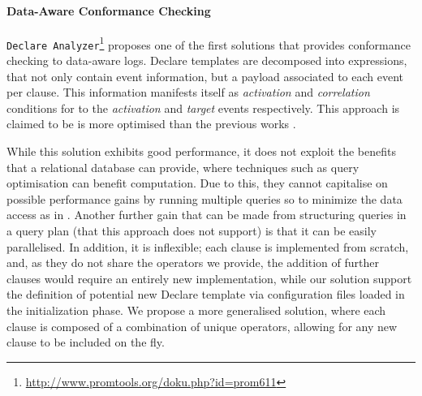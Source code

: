 \paragraph*{Data-Aware Conformance Checking}
\texttt{Declare Analyzer}\footnote{\url{http://www.promtools.org/doku.php?id=prom611}} \cite{BurattinMS16} proposes one of the first solutions that provides conformance checking to data-aware logs. Declare templates are decomposed into \LTLf expressions, that not only contain event information, but a payload associated to each event per clause. This information manifests itself as \emph{activation} and \emph{correlation} conditions for to the \emph{activation} and \emph{target} events respectively. This approach is claimed to be is more optimised than the previous works \cite{VanDerAalst2005}.%

While this solution exhibits good performance, it does not exploit the benefits that a relational database can provide, where techniques such as query optimisation can benefit computation. Due to this, they cannot capitalise on possible performance gains by running multiple queries so to minimize the data access as in \cite{BellatrecheKB21}. Another further gain that can be made from structuring queries in a query plan (that this approach does not support) is that it can be easily parallelised. In addition, it is inflexible; each clause is implemented from scratch, and, as they do not share the operators we provide, the addition of further clauses would require an entirely new implementation, while our solution support the definition of potential new Declare template via configuration files loaded in the initialization phase. We propose a more generalised solution, where each clause is composed of a combination of unique operators, allowing for any new clause to be included on the fly. 

